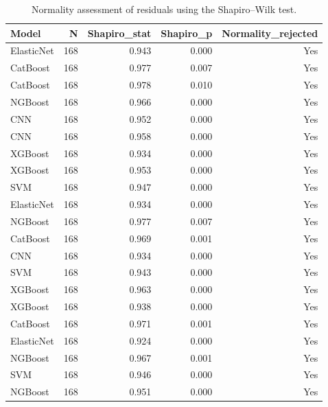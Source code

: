 \begin{table}
\centering
\caption{Normality assessment of residuals using the Shapiro--Wilk test.}
\label{tab:residual_normality}
\begin{tabular}{lrrrr}
\toprule
     Model &   N & Shapiro\_stat & Shapiro\_p & Normality\_rejected \\
\midrule
ElasticNet & 168 &        0.943 &     0.000 &                Yes \\
  CatBoost & 168 &        0.977 &     0.007 &                Yes \\
  CatBoost & 168 &        0.978 &     0.010 &                Yes \\
   NGBoost & 168 &        0.966 &     0.000 &                Yes \\
       CNN & 168 &        0.952 &     0.000 &                Yes \\
       CNN & 168 &        0.958 &     0.000 &                Yes \\
   XGBoost & 168 &        0.934 &     0.000 &                Yes \\
   XGBoost & 168 &        0.953 &     0.000 &                Yes \\
       SVM & 168 &        0.947 &     0.000 &                Yes \\
ElasticNet & 168 &        0.934 &     0.000 &                Yes \\
   NGBoost & 168 &        0.977 &     0.007 &                Yes \\
  CatBoost & 168 &        0.969 &     0.001 &                Yes \\
       CNN & 168 &        0.934 &     0.000 &                Yes \\
       SVM & 168 &        0.943 &     0.000 &                Yes \\
   XGBoost & 168 &        0.963 &     0.000 &                Yes \\
   XGBoost & 168 &        0.938 &     0.000 &                Yes \\
  CatBoost & 168 &        0.971 &     0.001 &                Yes \\
ElasticNet & 168 &        0.924 &     0.000 &                Yes \\
   NGBoost & 168 &        0.967 &     0.001 &                Yes \\
       SVM & 168 &        0.946 &     0.000 &                Yes \\
   NGBoost & 168 &        0.951 &     0.000 &                Yes \\

\end{tabular}
\end{table}
